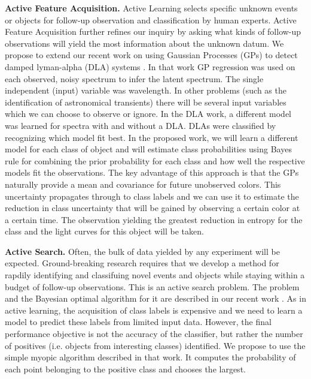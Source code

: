 \documentclass[useAMS,usenatbib,tightenlines,11pt,preprint]{aastex}
\begin{document}
{\bf Active Feature Acquisition.}  Active Learning selects specific unknown
events or objects for follow-up observation and classification by human 
experts.  Active
Feature Acquisition further refines our inquiry by asking what kinds of
follow-up observations will yield the most information about the unknown datum.
We propose to extend our recent work on 
using Gaussian Processes (GPs) to detect damped
lyman-alpha (DLA) systems \cite{Garnett12a}.  In that work GP regression
was used on each observed, noisy spectrum to infer the latent spectrum.
The single independent (input) variable was wavelength.  
In other problems (such as the identification of astronomical transients) there
will be several input variables which we can choose to observe or ignore.
In the DLA work, a different model was learned for
spectra with and without a DLA.  DLAs were classified by recognizing which
model fit best.  In the proposed work, we will learn a different model for
each class of object and will estimate class probabilities using Bayes rule
for combining the prior probability for each class and how well the
respective models fit the observations.  The key advantage of this approach
is that the GPs naturally provide a mean and covariance for future
unobserved colors.  This uncertainty propagates through to class labels and
we can use it to estimate the reduction in class uncertainty that will be
gained by observing a certain color at a certain time.  The observation
yielding the greatest reduction in entropy for the class and the light
curves for this object will be taken.

{\bf Active Search.}  Often, the bulk of data yielded by any experiment will be
expected.  Ground-breaking research requires that we develop a method for
rapdily identifying and classifuing novel events and objects
while staying within a
budget of follow-up observations.  This is an active search problem. The
problem and the Bayesian optimal algorithm for it are described in our
recent work \cite{Garnett11,Garnett12}.  As in active learning, the
acquisition of class labels is expensive and we need to learn a model to
predict these labels from limited input data.  However, the final
performance objective is not the accuracy of the classifier, but rather the
number of positives (i.e. objects from interesting classes) identified.  We
propose to use the simple myopic algorithm described in that work.  It
computes the probability of each point belonging to the positive class and
chooses the largest.
\end{document}
